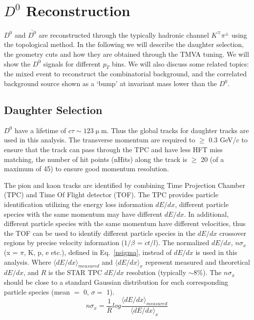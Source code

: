 \clearpage

\section{$D^0$ Reconstruction}

$D^{0}$ and $\bar{D^{0}}$ are reconstructed through the typically hadronic channel $K^{\mp}\pi^{\pm}$ using the topological method. In the following we will describe the daughter selection, the geometry cuts and how they are obtained through the TMVA tuning. We will show the $D^0$ signals for different $p_T$ bins. We will also discuss some related topics: the mixed event to reconstruct the combinatorial background, and the correlated background source shown as a `bump' at invariant mass lower than the $D^0$. 

\subsection{Daughter Selection}
\label{daughterSelection}
$D^0$ have a lifetime of $c\tau\sim123 \upmu$m. Thus the global tracks for daughter tracks are used in this analysis. The transverse momentum are required to $\geq$ 0.3 GeV/$c$ to ensure that the track can pass through the TPC and have less HFT miss matching, the number of hit points (nHits) along the track is $\geq$ 20 (of a maximum of 45) to ensure good momentum resolution.

The pion and kaon tracks are identified by combining Time Projection Chamber (TPC) and Time Of Flight detector (TOF). The TPC provides particle identification utilizing the energy loss information $dE/dx$, different particle species with the same momentum may have different $dE/dx$. In additional, different particle species with the same momentum have different velocities, thus the TOF can be used to identify different particle species in the $dE/dx$ crossover regions by precise velocity information ($1/\beta$ = $ct/l$). The normalized $dE/dx$, $n\sigma_x$ (x = $\pi$, K, p, e etc.), defined in Eq.~\ref{nsigma}, instead of $dE/dx$ is used in this analysis. Where $\langle{dE/dx}\rangle_{measured}$ and $\langle{dE/dx}\rangle_{x}$ represent measured and theoretical $dE/dx$, and $R$ is the STAR TPC $dE/dx$ resolution (typically $\sim$8\%). The $n\sigma_x$ should be close to a standard Gaussian distribution for each corresponding particle species (mean $=$ 0, $\sigma = $ 1).
\begin{equation}
  n\sigma_x = \frac{1}{R}log\frac{\langle{dE/dx}\rangle_{measured}}{\langle{dE/dx}\rangle_{x}}
\label{nsigma}
\end{equation}

